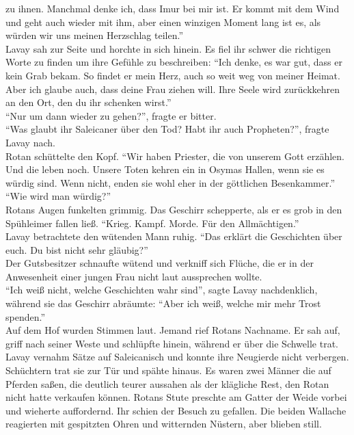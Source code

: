 zu ihnen. Manchmal denke ich, dass Imur bei mir ist. Er kommt mit dem Wind und geht auch wieder 
mit ihm, aber einen winzigen Moment lang ist es, als würden wir uns meinen Herzschlag teilen.''\\
Lavay sah zur Seite und horchte in sich hinein. Es fiel ihr schwer die richtigen Worte zu finden um 
ihre Gefühle zu beschreiben: ``Ich denke, es war gut, dass er kein Grab bekam. So findet er mein 
Herz, auch so weit weg von meiner Heimat. Aber ich glaube auch, dass deine Frau ziehen 
will. Ihre Seele wird zurückkehren an den Ort, den du ihr schenken wirst.''\\
``Nur um dann wieder zu gehen?'', fragte er bitter.\\
``Was glaubt ihr Saleicaner über den Tod? Habt ihr auch Propheten?'', fragte Lavay nach.\\
Rotan schüttelte den Kopf. ``Wir haben Priester, die von unserem Gott erzählen. Und die leben noch. 
Unsere Toten kehren ein in Osymas Hallen, wenn sie es würdig sind. Wenn nicht, enden sie wohl eher 
in der göttlichen Besenkammer.''\\
``Wie wird man würdig?''\\
Rotans Augen funkelten grimmig. Das Geschirr schepperte, als er es grob in den Spühleimer fallen 
ließ. ``Krieg. Kampf. Morde. Für den Allmächtigen.''\\
Lavay betrachtete den wütenden Mann ruhig. ``Das erklärt die Geschichten über euch. Du bist nicht 
sehr gläubig?''\\
Der Gutsbesitzer schnaufte wütend und verkniff sich Flüche, die er in der Anwesenheit einer jungen 
Frau nicht laut aussprechen wollte.\\
``Ich weiß nicht, welche Geschichten wahr sind'', sagte Lavay nachdenklich, während sie das 
Geschirr abräumte: ``Aber ich weiß, welche mir mehr Trost spenden.''\\
Auf dem Hof wurden Stimmen laut. Jemand rief Rotans Nachname. Er sah auf, griff nach seiner Weste 
und schlüpfte hinein, während er über die Schwelle trat. Lavay vernahm Sätze auf Saleicanisch und 
konnte ihre Neugierde nicht verbergen. Schüchtern trat sie zur Tür und spähte hinaus. Es waren zwei 
Männer die auf Pferden saßen, die deutlich teurer aussahen als der klägliche Rest, den Rotan nicht 
hatte verkaufen können. Rotans Stute preschte am Gatter der Weide vorbei und wieherte auffordernd. 
Ihr schien der Besuch zu gefallen. Die beiden Wallache reagierten mit gespitzten Ohren und 
witternden Nüstern, aber blieben still.\\
